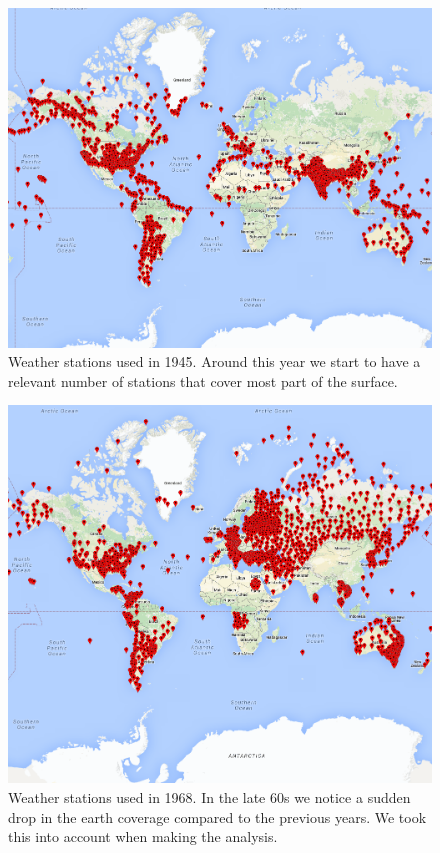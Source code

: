 \documentclass{vldb}
\begin{document}
\begin{figure}[tbh]
\includegraphics[width=1\linewidth]{stations1945}
\caption{Weather stations used in 1945. Around this year we start to have a relevant number of stations that cover most part of the surface.}
\label{fig:stations1945}
\end{figure}

\begin{figure}[tbh]
\includegraphics[width=1\linewidth]{stations1968}
\caption{Weather stations used in 1968. In the late 60s we notice a sudden drop in the earth coverage compared to the previous years. We took this into account when making the analysis.}
\label{fig:stations1968}
\end{figure}
\end{document}
